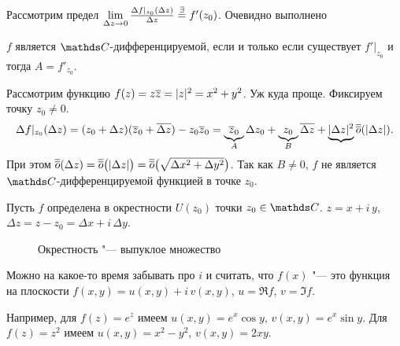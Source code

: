 Рассмотрим предел $\lim\limits_{\Delta z\rightarrow0}\frac{\Delta f|_{z_0}(\Delta z)}{\Delta z}\overset{\exists}=f'(z_0)$. Очевидно выполнено
\begin{Sl}
	$f$ является $\C$-дифференцируемой, если и только если существует $f'|_{z_0}$ и тогда $A = f'_{z_0}$.
\end{Sl}

Рассмотрим функцию $f(z) = z\overline{z} = |z|^2 = x^2 + y^2$. Уж куда проще. Фиксируем точку $z_0\ne0$.
\[
	\Delta f|_{z_0}(\Delta z) = (z_0+\Delta z)(\overline{z}_0+\overline{\Delta z}) - z_0\overline{z}_0 = 
	\underbrace{\overline{z}_0}_{A}\Delta z_0 + 
	\underbrace{z_0}_B\overline{\Delta z} + 
	\underbrace{|\Delta z|^2}{\overline{\overline o}(|\Delta z|)}.
\]
При этом $\overline{\overline o}(\Delta z) = \overline{\overline o}\big(|\Delta z|\big) = \overline{\overline o}\big(\sqrt{\Delta x^2+\Delta y^2}\big)$. Так как $B\ne0$, $f$ не является $\C$-дифференцируемой функцией в точке $z_0$.

Пусть $f$ определена в окрестности $U(z_0)$ точки $z_0\in\C$. $z = x+i\,y$, $\Delta z = z - z_0 = \Delta x + i\,\Delta y$.
\begin{figure}[H]
	\centering
	\caption{Окрестность "--- выпуклое множество}
	\label{fig9}
\end{figure}
Можно на какое-то время забывать про $i$ и считать, что $f(x)$ "--- это функция на плоскости $f(x,y)=u(x,y) + i\, v(x,y)$, $u = \Re f$, $v= \Im f$.

Например, для $f(z) = e^z$ имеем $u(x,y) = e^x\cos y$, $v(x,y) = e^x\sin y$. Для $f(z) = z^2$ имеем $u(x,y) = x^2 - y^2$, $v(x,y) = 2xy$.

